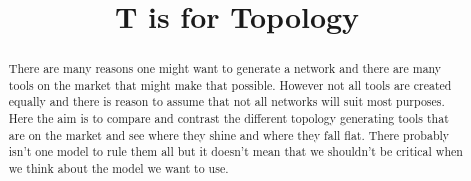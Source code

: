 \documentclass[
]{agujournal2019}
\begin{document}
\title{T is for Topology}



\begin{abstract}
There are many reasons one might want to generate a network and there
are many tools on the market that might make that possible. However not
all tools are created equally and there is reason to assume that not all
networks will suit most purposes. Here the aim is to compare and
contrast the different topology generating tools that are on the market
and see where they shine and where they fall flat. There probably isn't
one model to rule them all but it doesn't mean that we shouldn't be
critical when we think about the model we want to use.
\end{abstract}
\end{document}
